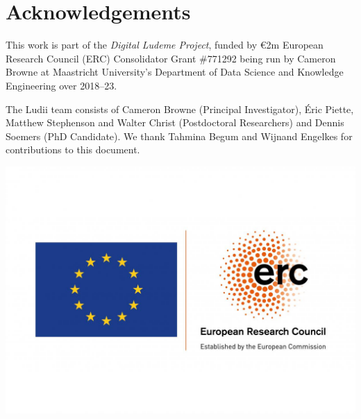 \documentclass[10pt,twoside]{report}
\begin{document}







\chapter*{Acknowledgements}

This work is part of the {\it Digital Ludeme Project}, funded by \euro2m European Research Council (ERC) Consolidator Grant \#771292 being run by Cameron Browne at Maastricht University's Department of Data Science and Knowledge Engineering over 2018--23. 

The Ludii team consists of Cameron Browne (Principal Investigator), {\'E}ric Piette, Matthew Stephenson and Walter Christ (Postdoctoral Researchers) and Dennis Soemers (PhD Candidate). 
We thank Tahmina Begum and Wijnand Engelkes for contributions to this document.

\includegraphics[scale=0.3,right]{figs/LOGO_ERC-FLAG_EU_.jpg}


\appendix



\fancyhead[C]{\leftmark {} - \rightmark}





\end{document}
